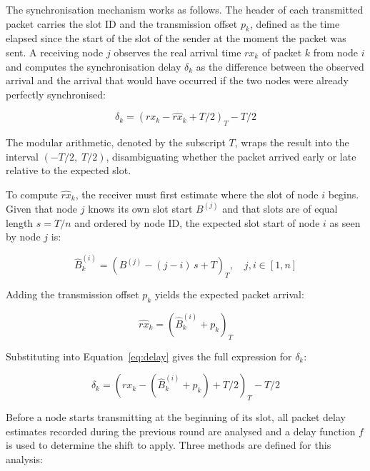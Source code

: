 The synchronisation mechanism works as follows. The header of each
transmitted packet carries the slot ID and the transmission offset
$p_k$, defined as the time elapsed since the start of the slot of the sender
at the moment the packet was sent. A receiving node $j$ observes
the real arrival time $rx_k$ of packet $k$ from node $i$ and computes
the synchronisation delay $\delta_k$ as the difference between the
observed arrival and the arrival that would have occurred if the two
nodes were already perfectly synchronised:

\begin{equation}
\delta_k = (rx_k - \hat{rx}_k + T/2)_T - T/2
\label{eq:delay}
\end{equation}

The modular arithmetic, denoted by the subscript $T$, wraps the result
into the interval $(-T/2,\; T/2)$, disambiguating whether the packet
arrived early or late relative to the expected slot.

To compute $\hat{rx}_k$, the receiver must first estimate where the slot of
node $i$ begins. Given that node $j$ knows its own slot start
$B^{(j)}$ and that slots are of equal length $s = T/n$ and ordered by
node ID, the expected slot start of node $i$ as seen by node $j$ is:

\begin{equation}
\hat{B}^{(i)}_k = (B^{(j)} - (j - i)\,s + T)_T,
\quad j, i \in [1, n]
\label{eq:expected-slot}
\end{equation}

Adding the transmission offset $p_k$ yields the expected packet arrival:

\begin{equation}
\hat{rx}_k = (\hat{B}^{(i)}_k + p_k)_T
\label{eq:expected-rx}
\end{equation}

Substituting into Equation~\ref{eq:delay} gives the full expression
for $\delta_k$:

\begin{equation}
\delta_k = (rx_k - (\hat{B}^{(i)}_k + p_k) + T/2)_T - T/2
\label{eq:delay-full}
\end{equation}

Before a node starts transmitting at the beginning of its slot, all
packet delay estimates recorded during the previous round are analysed
and a delay function $f$ is used to determine the shift to apply. Three
methods are defined for this analysis:

